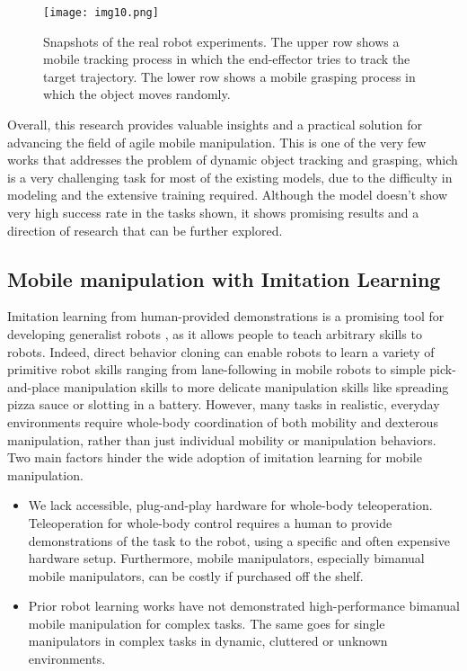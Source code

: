 \begin{figure}[t]
	\centering
	\texttt{[image: img10.png]}
	\captionsetup{width=1\linewidth}
	\caption{Snapshots of the real robot experiments. The upper row shows a mobile
		tracking process in which the end-effector tries to track the target trajectory.
		The lower row shows a mobile grasping process in which the object moves
		randomly. \cite{wang2022multitask}}
	\label{fig:img10}
\end{figure}

Overall, this research provides valuable insights and a practical solution for advancing the
field of agile mobile manipulation. This is one of the very few works that addresses the
problem of dynamic object tracking and grasping, which is a very challenging task for most
of the existing models, due to the difficulty in modeling and the extensive training required. Although
the model doesn't show very high success rate in the tasks shown, it shows promising results
and a direction of research that can be further explored.


\subsection{Mobile manipulation with Imitation Learning}

Imitation learning from human-provided demonstrations is a promising tool for developing generalist
robots \cite{tony2024mobile}, as it allows people to teach arbitrary skills to robots.
Indeed, direct behavior cloning can enable robots to learn a variety of primitive robot skills
ranging from lane-following in mobile robots to simple pick-and-place manipulation skills
to more delicate manipulation skills like spreading pizza sauce or slotting in a battery.
However, many tasks in realistic, everyday environments require whole-body coordination of both mobility
and dexterous manipulation, rather than just individual mobility or manipulation behaviors.
Two main factors hinder the wide adoption of imitation learning for mobile manipulation.

\begin{itemize}
	\item We lack accessible, plug-and-play hardware for whole-body teleoperation. Teleoperation
	      for whole-body control requires a human to provide demonstrations of the task to the robot,
	      using a specific and often expensive hardware setup. Furthermore, mobile manipulators,
	      especially bimanual mobile manipulators, can be costly if purchased off the shelf.
	\item Prior robot learning works have not demonstrated high-performance bimanual mobile manipulation
	      for complex tasks. The same goes for single manipulators in complex tasks in dynamic,
	      cluttered or unknown environments.
\end{itemize}

